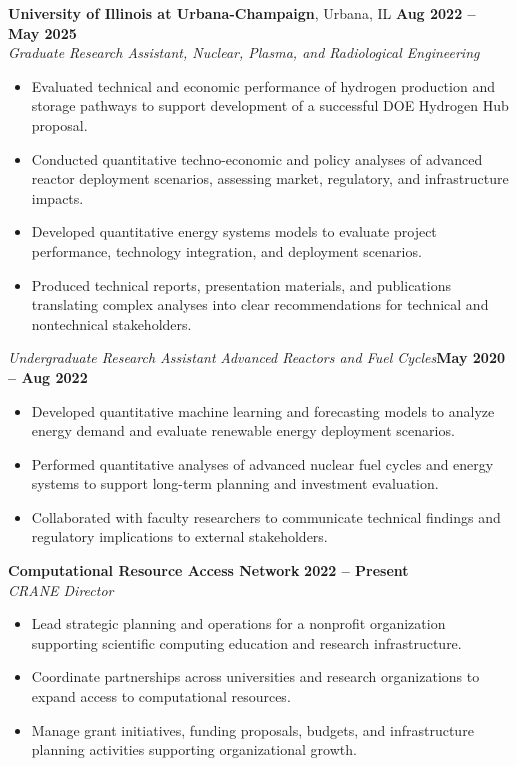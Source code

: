 \documentclass[margin,line]{resume}
\begin{document}
\begin{resume}
    \textbf{University of Illinois at Urbana-Champaign}, Urbana, IL \hfill \textbf{Aug 2022 -- May 2025} \\
    \textsl{Graduate Research Assistant, Nuclear, Plasma, and Radiological Engineering} \\
    \begin{itemize}
        \item Evaluated technical and economic performance of hydrogen production and storage pathways to support development of a successful DOE Hydrogen Hub proposal.
        \item Conducted quantitative techno-economic and policy analyses of advanced reactor deployment scenarios, assessing market, regulatory, and infrastructure impacts.
        \item Developed quantitative energy systems models to evaluate project performance, technology integration, and deployment scenarios.
        \item Produced technical reports, presentation materials, and publications translating complex analyses into clear recommendations for technical and nontechnical stakeholders.
    \end{itemize}

    \textsl{Undergraduate Research Assistant} \textsl{Advanced Reactors and Fuel Cycles}\hfill \textbf{May 2020 -- Aug 2022}\\
    \begin{itemize}
        \item Developed quantitative machine learning and forecasting models to analyze energy demand and evaluate renewable energy deployment scenarios.
        \item Performed quantitative analyses of advanced nuclear fuel cycles and energy systems to support long-term planning and investment evaluation.
        \item Collaborated with faculty researchers to communicate technical findings and regulatory implications to external stakeholders.
    \end{itemize}

    \textbf{Computational Resource Access Network} \hfill \textbf{2022 -- Present} \\
    \textsl{CRANE Director} \\
    \begin{itemize}
        \item Lead strategic planning and operations for a nonprofit organization supporting scientific computing education and research infrastructure.
        \item Coordinate partnerships across universities and research organizations to expand access to computational resources.
        \item Manage grant initiatives, funding proposals, budgets, and infrastructure planning activities supporting organizational growth.
    \end{itemize}


\end{resume}
\end{document}
